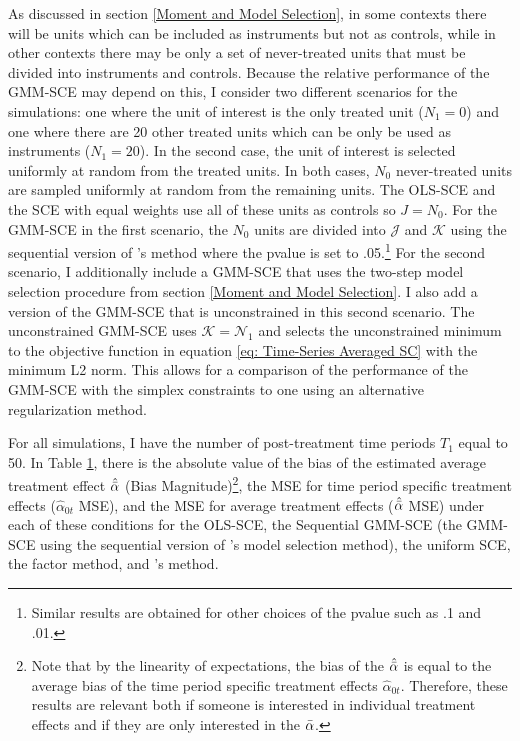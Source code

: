 \documentclass{article}
\begin{document}
 As discussed in section \ref{Moment and Model Selection}, in some contexts there will be units which can be included as instruments but not as controls, while in other contexts there may be only a set of never-treated units that must be divided into instruments and controls. Because the relative performance of the GMM-SCE may depend on this, I consider two different scenarios for the simulations: one where the unit of interest is the only treated unit ($N_1 = 0$) and one where there are 20 other treated units which can be only be used as instruments ($N_1 = 20$). In the second case, the unit of interest is selected uniformly at random from the treated units. In both cases, $N_0$ never-treated units are sampled uniformly at random from the remaining units. The OLS-SCE and the SCE with equal weights use all of these units as controls so $J = N_0$. For the GMM-SCE in the first scenario, the $N_0$ units are divided into $\mathcal{J}$ and $\mathcal{K}$ using the sequential version of \cite{MomentSelection}'s method where the pvalue is set to .05.\footnote{Similar results are obtained for other choices of the pvalue such as .1 and .01.} For the second scenario, I additionally include a GMM-SCE that uses the two-step model selection procedure from section \ref{Moment and Model Selection}. I also add a version of the GMM-SCE that is unconstrained in this second scenario. The unconstrained GMM-SCE uses $\mathcal{K} = \mathcal{N}_1$ and selects the unconstrained minimum to the objective function in equation \eqref{eq: Time-Series Averaged SC} with the minimum L2 norm. This allows for a comparison of the performance of the GMM-SCE with the simplex constraints to one using an alternative regularization method.
\par
For all simulations, I have the number of post-treatment time periods $T_1$ equal to 50. In Table \hyperref[Table1]{1}, there is the absolute value of the bias of the estimated average treatment effect $\hat{\Bar{\alpha}}$ (Bias Magnitude)\footnote{Note that by the linearity of expectations, the bias of the $\hat{\Bar{\alpha}}$ is equal to the average bias of the time period specific treatment effects $\hat{\alpha}_{0t}$. Therefore, these results are relevant both if someone is interested in individual treatment effects and if they are only interested in the $\Bar{\alpha}$.}, the MSE for time period specific treatment effects ($\hat{\alpha}_{0t}$ MSE), and the MSE for average treatment effects ($\hat{\Bar{\alpha}}$ MSE) under each of these conditions for the OLS-SCE, the Sequential GMM-SCE (the GMM-SCE using the sequential version of \cite{MomentSelection}'s model selection method), the uniform SCE, the factor method, and \cite{Powell2021}'s method.
\end{document}
